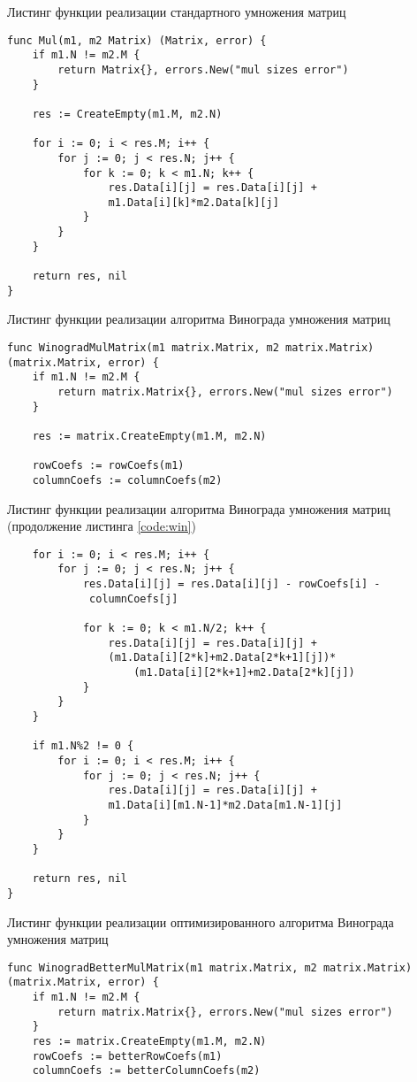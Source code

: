 \newpage

\begin{code}
\caption{Листинг функции реализации стандартного умножения матриц}
\label{code:stand}
\begin{verbatim}
func Mul(m1, m2 Matrix) (Matrix, error) {
	if m1.N != m2.M {
		return Matrix{}, errors.New("mul sizes error")
	}

	res := CreateEmpty(m1.M, m2.N)

	for i := 0; i < res.M; i++ {
		for j := 0; j < res.N; j++ {
			for k := 0; k < m1.N; k++ {
				res.Data[i][j] = res.Data[i][j] + 
				m1.Data[i][k]*m2.Data[k][j]
			}
		}
	}

	return res, nil
}
\end{verbatim}
\end{code}

\begin{code}
\caption{Листинг функции реализации алгоритма Винограда умножения матриц}
\label{code:win}
\begin{verbatim}
func WinogradMulMatrix(m1 matrix.Matrix, m2 matrix.Matrix) 
(matrix.Matrix, error) {
	if m1.N != m2.M {
		return matrix.Matrix{}, errors.New("mul sizes error")
	}

	res := matrix.CreateEmpty(m1.M, m2.N)

	rowCoefs := rowCoefs(m1)
	columnCoefs := columnCoefs(m2)
\end{verbatim}
\end{code}

\begin{code}
\caption{Листинг функции реализации алгоритма Винограда умножения матриц (продолжение листинга \ref{code:win})}
\label{code:win2}
\begin{verbatim}
	for i := 0; i < res.M; i++ {
		for j := 0; j < res.N; j++ {
			res.Data[i][j] = res.Data[i][j] - rowCoefs[i] -
			 columnCoefs[j]

			for k := 0; k < m1.N/2; k++ {
				res.Data[i][j] = res.Data[i][j] + 
				(m1.Data[i][2*k]+m2.Data[2*k+1][j])*
					(m1.Data[i][2*k+1]+m2.Data[2*k][j])
			}
		}
	}

	if m1.N%2 != 0 {
		for i := 0; i < res.M; i++ {
			for j := 0; j < res.N; j++ {
				res.Data[i][j] = res.Data[i][j] + 
				m1.Data[i][m1.N-1]*m2.Data[m1.N-1][j]
			}
		}
	}

	return res, nil
}
\end{verbatim}
\end{code}

\begin{code}
\caption{Листинг функции реализации оптимизированного алгоритма Винограда умножения матриц}
\label{code:winBetter}
\begin{verbatim}
func WinogradBetterMulMatrix(m1 matrix.Matrix, m2 matrix.Matrix) 
(matrix.Matrix, error) {
	if m1.N != m2.M {
		return matrix.Matrix{}, errors.New("mul sizes error")
	}
	res := matrix.CreateEmpty(m1.M, m2.N)
	rowCoefs := betterRowCoefs(m1)
	columnCoefs := betterColumnCoefs(m2)
\end{verbatim}
\end{code}


